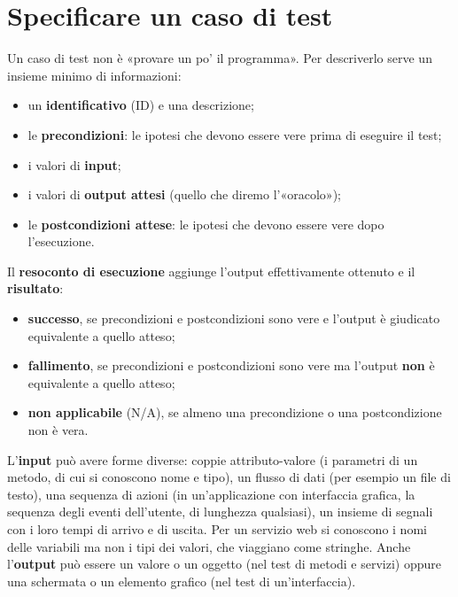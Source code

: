 \section{Specificare un caso di test}

Un caso di test non è «provare un po' il programma». Per descriverlo serve un insieme minimo di informazioni:

\begin{itemize}
  \item un \textbf{identificativo} (ID) e una descrizione;
  \item le \textbf{precondizioni}: le ipotesi che devono essere vere prima di eseguire il test;
  \item i valori di \textbf{input};
  \item i valori di \textbf{output attesi} (quello che diremo l'«oracolo»);
  \item le \textbf{postcondizioni attese}: le ipotesi che devono essere vere dopo l'esecuzione.
\end{itemize}

Il \textbf{resoconto di esecuzione} aggiunge l'output effettivamente ottenuto e il \textbf{risultato}:

\begin{itemize}
  \item \textbf{successo}, se precondizioni e postcondizioni sono vere e l'output è giudicato equivalente a quello atteso;
  \item \textbf{fallimento}, se precondizioni e postcondizioni sono vere ma l'output \textbf{non} è equivalente a quello
        atteso;
  \item \textbf{non applicabile} (N/A), se almeno una precondizione o una postcondizione non è vera.
\end{itemize}

L'\textbf{input} può avere forme diverse: coppie attributo-valore (i parametri di un metodo, di cui si conoscono nome e
tipo), un flusso di dati (per esempio un file di testo), una sequenza di azioni (in un'applicazione con interfaccia
grafica, la sequenza degli eventi dell'utente, di lunghezza qualsiasi), un insieme di segnali con i loro tempi di arrivo
e di uscita. Per un servizio web si conoscono i nomi delle variabili ma non i tipi dei valori, che viaggiano come
stringhe. Anche l'\textbf{output} può essere un valore o un oggetto (nel test di metodi e servizi) oppure una schermata o
un elemento grafico (nel test di un'interfaccia).

